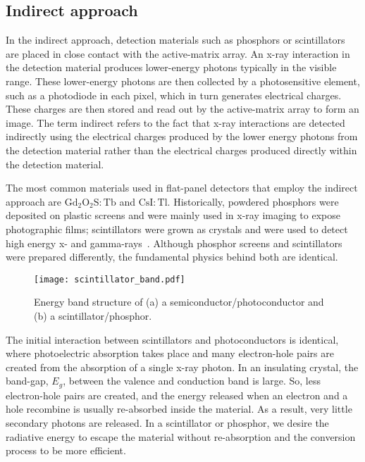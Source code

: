 \subsection{Indirect approach}
In the indirect approach, detection materials such as phosphors or scintillators are placed in close contact with the active-matrix array.  An x-ray interaction in the detection material produces lower-energy photons typically in the visible range.  These lower-energy photons are then collected by a photosensitive element, such as a photodiode in each pixel, which in turn generates electrical charges.  These charges are then stored and read out by the active-matrix array to form an image.  The term indirect refers to the fact that x-ray interactions are detected indirectly using the electrical charges produced by the lower energy photons from the detection material rather than the electrical charges produced directly within the detection material.  

The most common materials used in flat-panel detectors that employ the indirect approach are $\mathrm{Gd_2O_2S:Tb}$ and $\mathrm{CsI:Tl}$.  Historically, powdered phosphors were deposited on plastic screens and were mainly used in x-ray imaging to expose photographic films; scintillators were grown as crystals and were used to detect high energy x- and gamma-rays~\citep{Nikl2006}.  Although phosphor screens and scintillators were prepared differently, the fundamental physics behind both are identical.  

\begin{figure}[h]
\centering
\texttt{[image: scintillator\_band.pdf]}
\caption{Energy band structure of (a) a semiconductor/photoconductor and (b) a scintillator/phosphor.}
\label{fig:scintillator_band}
\end{figure}

The initial interaction between scintillators and photoconductors is identical, where photoelectric absorption takes place and many electron-hole pairs are created from the absorption of a single x-ray photon.  In an insulating crystal, the band-gap, $E_g$, between the valence and conduction band is large.  So, less electron-hole pairs are created, and the energy released when an electron and a hole recombine is usually re-absorbed inside the material.  As a result, very little secondary photons are released.  In a scintillator or phosphor, we desire the radiative energy to escape the material without re-absorption and the conversion process to be more efficient.


